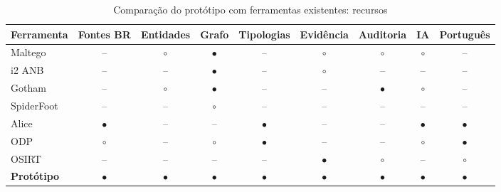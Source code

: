 \begin{table}[htbp]
\centering
\caption[Comparação com ferramentas existentes: recursos]{Comparação do protótipo com ferramentas existentes: recursos}
\label{tab:mercado}
\footnotesize
\setlength{\tabcolsep}{2.5pt}
\begin{tabular}{lcccccccc}
\hline
\textbf{Ferramenta} & \textbf{Fontes BR} & \textbf{Entidades} & \textbf{Grafo} & \textbf{Tipologias} & \textbf{Evidência} & \textbf{Auditoria} & \textbf{IA} & \textbf{Português} \\
\hline
Maltego & -- & $\circ$ & $\bullet$ & -- & $\circ$ & $\circ$ & $\circ$ & -- \\
i2 ANB & -- & -- & $\bullet$ & -- & $\circ$ & -- & -- & -- \\
Gotham & -- & $\circ$ & $\bullet$ & -- & -- & $\bullet$ & $\circ$ & -- \\
SpiderFoot & -- & -- & $\circ$ & -- & -- & -- & -- & -- \\
Alice & $\bullet$ & -- & -- & $\bullet$ & -- & -- & $\bullet$ & $\bullet$ \\
ODP & $\circ$ & -- & $\circ$ & $\bullet$ & -- & -- & $\circ$ & $\bullet$ \\
OSIRT & -- & -- & -- & -- & $\bullet$ & $\circ$ & -- & $\circ$ \\
\textbf{Protótipo} & $\bullet$ & $\bullet$ & $\bullet$ & $\bullet$ & $\bullet$ & $\bullet$ & $\bullet$ & $\bullet$ \\
\hline
\end{tabular}
\end{table}

